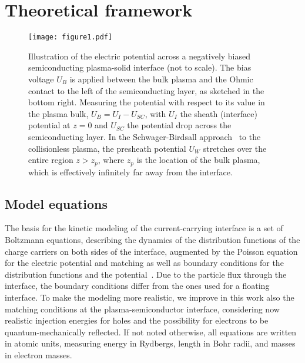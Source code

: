 \documentclass[pre,reprint,floats]{revtex4-1}
\begin{document}
\section{Theoretical framework}\label{sec:Theory}

\begin{figure}
\texttt{[image: figure1.pdf]}
\caption{Illustration of the electric potential across a negatively biased semiconducting plasma-solid 
interface (not to scale). The bias voltage $U_B$ is applied between the bulk plasma and the Ohmic 
contact to the left of the semiconducting layer, as sketched in the bottom right. Measuring the potential 
with respect to its value in the plasma bulk, $U_B=U_I-U_{SC}$, with $U_I$ the sheath (interface) 
potential at $z=0$ and $U_{SC}$ the potential drop across the semiconducting layer. In the 
Schwager-Birdsall approach~\cite{SB90} to the collisionless plasma, the presheath potential $U_W$ 
stretches over the entire region $z>z_p$, where $z_p$ is the location of the bulk plasma, which is
effectively infinitely far away from the interface.}
\label{fig:concept}
\end{figure}

\subsection{Model equations}\label{sec:Eqs}
The basis for the kinetic modeling 
of the current-carrying interface is a set of Boltzmann equations, describing the dynamics of the 
distribution functions of the charge carriers on both sides of the interface, augmented by the Poisson
equation for the electric potential and matching as well as boundary conditions for the distribution 
functions and the potential~\cite{BF17}. Due to the particle flux through the interface, the boundary
conditions differ from the ones used for a floating interface. To make the modeling more realistic, we
improve in this work also the matching conditions at the plasma-semiconductor interface, considering now 
realistic injection energies for holes and the possibility for electrons to be quantum-mechanically 
reflected. If not noted otherwise, all equations are written in atomic units, measuring energy in 
Rydbergs, length in Bohr radii, and masses in electron masses. 
	
\end{document}
